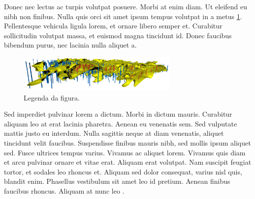 Donec nec lectus ac turpis volutpat posuere. Morbi at enim diam. Ut eleifend eu nibh non finibus. Nulla quis orci sit amet ipsum tempus volutpat in a metus \ref{fig_1}. Pellentesque vehicula ligula lorem, et ornare libero semper et. Curabitur sollicitudin volutpat massa, et euismod magna tincidunt id. Donec faucibus bibendum purus, nec lacinia nulla aliquet a.

\begin{figure}
	\caption{Legenda da figura.}
	\label{fig_1}
	\centering
	\includegraphics[width=0.7\textwidth]{capitulo_1/figuras/domaining.png}
\end{figure}

Sed imperdiet pulvinar lorem a dictum. Morbi in dictum mauris. Curabitur aliquam leo at erat lacinia pharetra. Aenean eu venenatis sem. Sed vulputate mattis justo eu interdum. Nulla sagittis neque at diam venenatis, aliquet tincidunt velit faucibus. Suspendisse finibus mauris nibh, sed mollis ipsum aliquet sed. Fusce ultrices tempus varius. Vivamus ac aliquet lorem. Vivamus quis diam et arcu pulvinar ornare et vitae erat. Aliquam erat volutpat. Nam suscipit feugiat tortor, et sodales leo rhoncus et. Aliquam sed dolor consequat, varius nisl quis, blandit enim. Phasellus vestibulum sit amet leo id pretium. Aenean finibus faucibus rhoncus. Aliquam at nunc leo \cite{isaaks1989applied}.